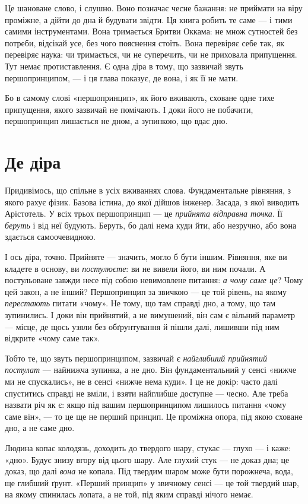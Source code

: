 \documentclass[12pt, a4paper, openany]{book}
\begin{document}
Це шановане слово, і слушно. Воно позначає чесне бажання: не приймати на віру проміжне, а дійти до дна й будувати звідти. Ця книга робить те саме --- і тими самими інструментами. Вона тримається Бритви Оккама: не множ сутностей без потреби, відсікай усе, без чого пояснення стоїть. Вона перевіряє себе так, як перевіряє наука: чи тримається, чи не суперечить, чи не приховала припущення. Тут немає протиставлення. Є одна діра в тому, що зазвичай звуть першопринципом, --- і ця глава показує, де вона, і як її не мати.

Бо в самому слові «першопринцип», як його вживають, сховане одне тихе припущення, якого зазвичай не помічають. І доки його не побачити, першопринцип лишається не дном, а зупинкою, що вдає дно.

\section{Де діра}

Придивімось, що спільне в усіх вживаннях слова. Фундаментальне рівняння, з якого рахує фізик. Базова істина, до якої дійшов інженер. Засада, з якої виводить Арістотель. У всіх трьох першопринцип --- це \emph{прийнята відправна точка}. Її \emph{беруть} і від неї будують. Беруть, бо далі нема куди йти, або незручно, або вона здається самоочевидною.

І ось діра, точно. Прийняте --- значить, могло б бути іншим. Рівняння, яке ви кладете в основу, ви \emph{постулюєте}: ви не вивели його, ви ним почали. А постульоване завжди несе під собою невимовлене питання: \emph{а чому саме це}? Чому цей закон, а не інший? Першопринцип за звичкою --- це той рівень, на якому \emph{перестають} питати «чому». Не тому, що там справді дно, а тому, що там зупинились. І доки він прийнятий, а не вимушений, він сам є вільний параметр --- місце, де щось узяли без обґрунтування й пішли далі, лишивши під ним відкрите «чому саме так».

Тобто те, що звуть першопринципом, зазвичай є \emph{найглибший прийнятий постулат} --- найнижча зупинка, а не дно. Він фундаментальний у сенсі «нижче ми не спускались», не в сенсі «нижче нема куди». І це не докір: часто далі спуститись справді не вміли, і взяти найглибше доступне --- чесно. Але треба назвати річ як є: якщо під вашим першопринципом лишилось питання «чому саме він», --- то це ще не перший принцип. Це проміжна опора, під якою сховане дно, а не саме дно.

\begin{analogybox}
Людина копає колодязь, доходить до твердого шару, стукає --- глухо --- і каже: «дно». Будує знизу вгору від цього шару. Але глухий стук --- не доказ дна; це доказ, що далі \emph{вона} не копала. Під твердим шаром може бути порожнеча, вода, ще глибший ґрунт. «Перший принцип» у звичному сенсі --- це той твердий шар, на якому спинилась лопата, а не той, під яким справді нічого немає.
\end{analogybox}
\end{document}
